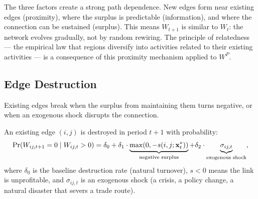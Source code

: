 \documentclass[../structural_economics_book.tex]{subfiles}
\begin{document}
\begin{intuition}
The three factors create a strong path dependence. New edges form near existing edges (proximity), where the surplus is predictable (information), and where the connection can be sustained (surplus). This means $W_{t+1}$ is similar to $W_t$: the network evolves gradually, not by random rewiring. The principle of relatedness \citep{hidalgo2007product} --- the empirical law that regions diversify into activities related to their existing activities --- is a consequence of this proximity mechanism applied to $W^P$.
\end{intuition}


\subsection{Edge Destruction}

Existing edges break when the surplus from maintaining them turns negative, or when an exogenous shock disrupts the connection.

\begin{definition}\label{ch13:def:destruction}
An existing edge $(i, j)$ is destroyed in period $t+1$ with probability:
\begin{equation}\label{ch13:eq:destruction}
\Pr(W_{ij,t+1} = 0 \mid W_{ij,t} > 0) = \delta_0 + \delta_1 \cdot \underbrace{\max(0, -s(i, j; \mathbf{x}_t^*))}_{\text{negative surplus}} + \delta_2 \cdot \underbrace{\sigma_{ij,t}}_{\text{exogenous shock}},
\end{equation}
where $\delta_0$ is the baseline destruction rate (natural turnover), $s < 0$ means the link is unprofitable, and $\sigma_{ij,t}$ is an exogenous shock (a crisis, a policy change, a natural disaster that severs a trade route).
\end{definition}
\end{document}
